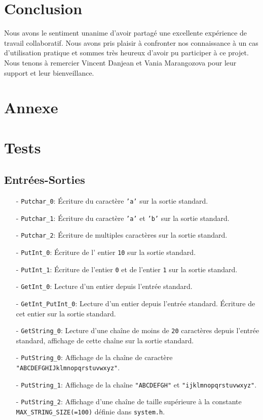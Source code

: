 \documentclass[11pt]{article}
\theoremstyle{definition}
\theoremstyle{definition}
\begin{document}
\section{Conclusion}
Nous avons le sentiment unanime d'avoir partagé une excellente expérience de travail collaboratif. Nous avons pris plaisir à confronter nos connaissance à un cas d'utilisation pratique et sommes très heureux d'avoir pu participer à ce projet. Nous tenons à remercier Vincent Danjean et Vania Marangozova pour leur support et leur bienveillance.
\section{Annexe}

\section{Tests}

\subsection{Entrées-Sorties}
\begin{itemize}
\item[-] \texttt{Putchar\_0}: Écriture du caractère \texttt{'a'} sur la sortie standard.
\item[-] \texttt{Putchar\_1}: Écriture du caractère \texttt{'a'} et \texttt{'b'} sur la sortie standard.
\item[-] \texttt{Putchar\_2}: Écriture de multiples caractères sur la sortie standard.
\item[-] \texttt{PutInt\_0}: Écriture de l' entier \texttt{10} sur la sortie standard.
\item[-] \texttt{PutInt\_1}: Écriture de l'entier \texttt{0} et de l'entier \texttt{1} sur la sortie standard.
\item[-] \texttt{GetInt\_0}: Lecture d'un entier depuis l'entrée standard.
\item[-] \texttt{GetInt\_PutInt\_0}:
  Lecture d'un entier depuis l'entrée standard.
  Écriture de cet entier sur la sortie standard.
\item[-] \texttt{GetString\_0}: Lecture d'une chaîne de moins de \texttt{20} caractères depuis l'entrée standard, affichage de cette chaîne sur la sortie standard.
\item[-] \texttt{PutString\_0}: Affichage de la chaîne de caractère \texttt{"ABCDEFGHIJklmnopqrstuvwxyz"}.
\item[-] \texttt{PutString\_1}: Affichage de la chaîne \texttt{"ABCDEFGH"} et \texttt{"ijklmnopqrstuvwxyz"}.
\item[-] \texttt{PutString\_2}:   Affichage d'une chaîne de taille supérieure à la
  constante \texttt{MAX\_STRING\_SIZE(=100)} définie dans \texttt{system.h}.
\end{itemize}
\end{document}
